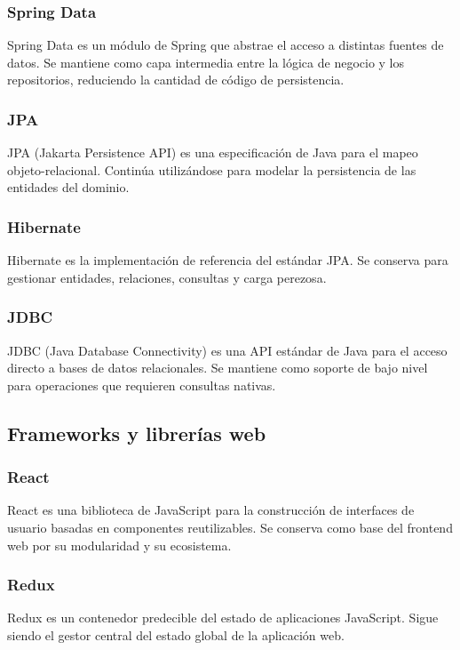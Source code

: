 \subsubsection{Spring Data}
Spring Data \cite{springdata} es un módulo de Spring que abstrae el acceso a distintas fuentes de datos. Se mantiene como capa intermedia entre la lógica de negocio y los repositorios, reduciendo la cantidad de código de persistencia.

\subsubsection{JPA}
JPA (Jakarta Persistence API) \cite{jpa} es una especificación de Java para el mapeo objeto-relacional. Continúa utilizándose para modelar la persistencia de las entidades del dominio.

\subsubsection{Hibernate}
Hibernate \cite{hibernate} es la implementación de referencia del estándar JPA. Se conserva para gestionar entidades, relaciones, consultas y carga perezosa.

\subsubsection{JDBC}
JDBC (Java Database Connectivity) \cite{jdbc} es una API estándar de Java para el acceso directo a bases de datos relacionales. Se mantiene como soporte de bajo nivel para operaciones que requieren consultas nativas.

\subsection{Frameworks y librerías web}

\subsubsection{React}
React \cite{react} es una biblioteca de JavaScript para la construcción de interfaces de usuario basadas en componentes reutilizables. Se conserva como base del frontend web por su modularidad y su ecosistema.

\subsubsection{Redux}
Redux \cite{redux} es un contenedor predecible del estado de aplicaciones JavaScript. Sigue siendo el gestor central del estado global de la aplicación web.

